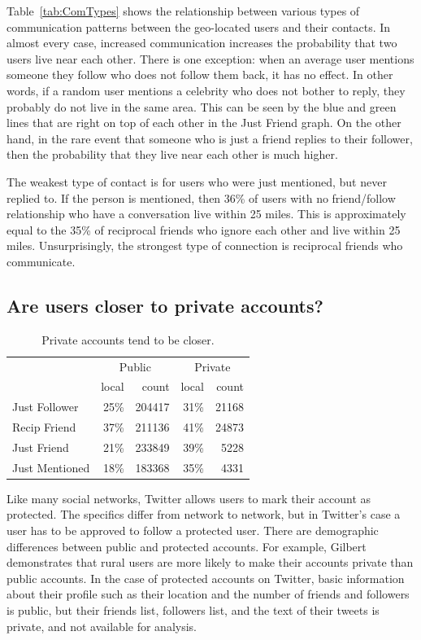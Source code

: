 Table~\ref{tab:ComTypes} shows the relationship between various types of
communication patterns between the geo-located users and their contacts.
In almost every case, increased communication increases the probability that
two users live near each other.
There is one exception: when an average user mentions someone they follow who
does not follow them back, it has no effect.
In other words, if a random user mentions a celebrity who does not bother to
reply, they probably do not live in the same area. This can be seen by the blue
and green lines that are right on top of each other in the Just Friend graph.
On the other hand, in the rare event that someone who is just a friend replies
to their follower, then the probability that they live near each other is much
higher.

The weakest type of contact is for users who were just mentioned, but never
replied to. If the person is mentioned, then 36\% of users with no
friend/follow relationship who have a conversation live within 25 miles.
This is approximately equal to the 35\% of reciprocal friends who ignore each
other and live within 25 miles.
Unsurprisingly, the strongest type of connection is reciprocal friends who
communicate.


\subsection{Are users closer to private accounts?}

\begin{table}[tbh]
\centering
\begin{tabular}{l | r r | r r}
    & \multicolumn{2}{c}{Public}
    & \multicolumn{2}{|c}{Private} \\
    \cline{2-5}
    &local&count&local&count \\
    \hline
    Just Follower & 25\%&204417 & 31\%&21168 \\
    Recip Friend & 37\%&211136 & 41\%&24873 \\
    Just Friend & 21\%&233849 & 39\%&5228 \\
    Just Mentioned & 18\%&183368 & 35\%&4331 \\
\end{tabular}
\caption{
    Private accounts tend to be closer.
}
\label{tab:EdgeTypesProt}
\end{table}

Like many social networks, Twitter allows users to mark their account as
protected. The specifics differ from network to network, but in Twitter's case
a user has to be approved to follow a protected user.
There are demographic differences between public and protected accounts.
For example, Gilbert \cite{gilbert2008network} demonstrates that rural users
are more likely to make their accounts private than public accounts.
In the case of protected accounts on Twitter, basic information
about their profile such as their location and the number of friends and
followers is public, but their friends list, followers list, and the text of
their tweets is private, and not available for analysis.

